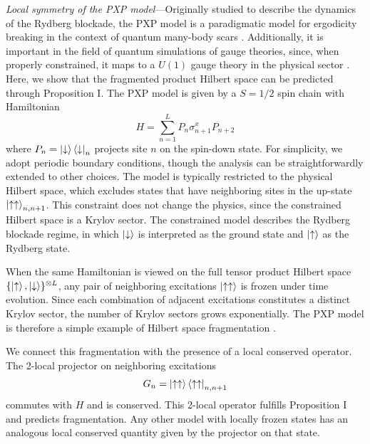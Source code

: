 \documentclass[
 reprint,
 amsmath,amssymb,
 aps,floatfix,prl,superscriptaddress
]{revtex4-2}
\newcounter{paranum}
\renewcommand{\theparanum}{\Roman{paranum}} %
\newcommand{\pnum}[1]{%
  \textit{#1}---}
\begin{document}
\pnum{Local symmetry of the PXP model}Originally studied to describe the dynamics of the Rydberg blockade, the PXP model \cite{Serbyn:2020wys, Bluvstein:2020ddz} is a paradigmatic model for ergodicity breaking in the context of quantum many-body scars \cite{Bernien:2017ubn, Turner:2017fxc, moudgalya_quantum_2021}. Additionally, it is important in the field of quantum simulations of gauge theories, since, when properly constrained, it maps to a $U(1)$ gauge theory in the physical sector \cite{Surace_2020}. Here, we show that the fragmented product Hilbert space can be predicted through Proposition I.
The PXP model is given by a $S=1/2$ spin chain with  Hamiltonian
\begin{equation}
    H = \sum_{n=1}^L P_n \sigma^x_{n+1} P_{n+2}
    \label{eq:PXP}
\end{equation}
where $P_n = \ket{\downarrow}\bra{\downarrow}_n$ projects site $n$ on the spin-down state. For simplicity, we adopt periodic boundary conditions, though the analysis can be straightforwardly extended to other choices. The model is typically restricted to the physical Hilbert space, which excludes states that have neighboring sites in the up-state $\ket{\uparrow\uparrow}_{n,n+1}$. This constraint does not change the physics, since the constrained Hilbert space is a Krylov sector. The constrained model describes the Rydberg blockade regime, in which $\ket{\downarrow}$ is interpreted as the ground state and $\ket{\uparrow}$ as the Rydberg state. 

When the same Hamiltonian is viewed on the full tensor product Hilbert space $\{\ket{\uparrow}, \ket{\downarrow}\}^{\otimes L}$, any pair of neighboring excitations $\ket{\uparrow \uparrow}$ is frozen under time evolution. Since each combination of adjacent excitations constitutes a distinct Krylov sector, the number of Krylov sectors grows exponentially. The PXP model is therefore a simple example of Hilbert space fragmentation \cite{moudgalya_quantum_2021}.

We connect this fragmentation with the presence of a local conserved operator.
The 2-local projector on neighboring excitations
\begin{equation}
    G_n = \ket{\uparrow\uparrow}\bra{\uparrow\uparrow}_{n,n+1}
\end{equation} 
commutes with $H$ and is conserved. 
This 2-local operator fulfills Proposition I and predicts fragmentation. Any other model with locally frozen states has an analogous local conserved quantity given by the projector on that state.
\end{document}
